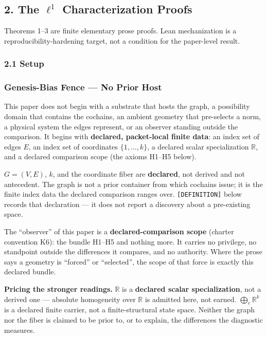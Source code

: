 \documentclass[
  11pt,
]{article}
\begin{document}
\hypertarget{the-ell1-characterization-proofs}{%
\subsection{\texorpdfstring{2. The \(\ell^1\) Characterization
Proofs}{2. The \textbackslash ell\^{}1 Characterization Proofs}}\label{the-ell1-characterization-proofs}}

Theorems 1--3 are finite elementary prose proofs. Lean mechanization is
a reproducibility-hardening target, not a condition for the paper-level
result.

\hypertarget{setup}{%
\subsubsection{2.1 Setup}\label{setup}}

\hypertarget{genesis-bias-fence-no-prior-host}{%
\subsubsection{Genesis-Bias Fence --- No Prior
Host}\label{genesis-bias-fence-no-prior-host}}

This paper does not begin with a substrate that hosts the graph, a
possibility domain that contains the cochains, an ambient geometry that
pre-selects a norm, a physical system the edges represent, or an
observer standing outside the comparison. It begins with
\textbf{declared, packet-local finite data}: an index set of edges
\(E\), an index set of coordinates \(\{1,\dots,k\}\), a declared scalar
specialization \(\mathbb R\), and a declared comparison scope (the
axioms H1--H5 below).

\(G=(V,E)\), \(k\), and the coordinate fiber are \textbf{declared}, not
derived and not antecedent. The graph is not a prior container from
which cochains issue; it is the finite index data the declared
comparison ranges over. \texttt{[DEFINITION]} below records that
declaration --- it does not report a discovery about a pre-existing
space.

The ``observer'' of this paper is a \textbf{declared-comparison scope}
(charter convention K6): the bundle H1--H5 and nothing more. It carries
no privilege, no standpoint outside the differences it compares, and no
authority. Where the prose says a geometry is ``forced'' or
``selected'', the scope of that force is exactly this declared bundle.

\textbf{Pricing the stronger readings.} \(\mathbb R\) is a
\textbf{declared scalar specialization}, not a derived one --- absolute
homogeneity over \(\mathbb R\) is admitted here, not earned.
\(\bigoplus_e \mathbb R^k\) is a declared finite carrier, not a
finite-structural state space. Neither the graph nor the fiber is
claimed to be prior to, or to explain, the differences the diagnostic
measures.
\end{document}

